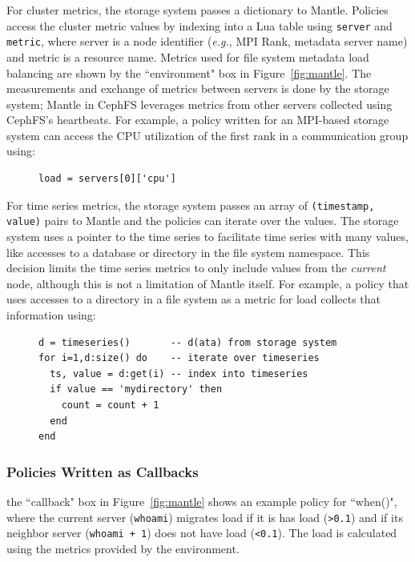 For cluster metrics, the storage system passes a dictionary to Mantle. Policies access
the cluster metric values by indexing into a Lua table using \texttt{server}
and \texttt{metric}, where server is a node identifier ({\it e.g.}, MPI Rank,
metadata server name) and metric is a resource name.  Metrics used for file
system metadata load balancing are shown by the ``environment" box in
Figure~\ref{fig:mantle}. The measurements and exchange of metrics between
servers is done by the storage system; Mantle in CephFS leverages metrics from other
servers collected using CephFS's heartbeats.  For example, a policy written for
an MPI-based storage system can access the CPU utilization of the first rank in a
communication group using:

\begin{figure}[h]
\footnotesize
\begin{verbatim}
load = servers[0]['cpu']
\end{verbatim}
\end{figure}

For time series metrics, the storage system passes an array of \texttt{(timestamp,
value)} pairs to Mantle and the policies can iterate over the values. The
storage system uses a pointer to the time series to facilitate time series with many
values, like accesses to a database or directory in the file system namespace.
This decision limits the time series metrics to only include values from the
{\it current} node, although this is not a limitation of Mantle itself.  For
example, a policy that uses accesses to a directory in a file system as a
metric for load collects that information using:

\begin{figure}[h]
\footnotesize
\begin{verbatim}
d = timeseries()       -- d(ata) from storage system
for i=1,d:size() do    -- iterate over timeseries
  ts, value = d:get(i) -- index into timeseries 
  if value == 'mydirectory' then
    count = count + 1
  end
end
\end{verbatim}
\end{figure}



\subsubsection{Policies Written as Callbacks} the ``callback" box in
Figure~\ref{fig:mantle} shows an example policy for ``when()", where the
current server (\texttt{whoami}) migrates load if it is has load
(\texttt{>0.1}) and if its neighbor server (\texttt{whoami + 1}) does not have
load (\texttt{<0.1}). The load is calculated using the metrics provided by the
environment.

